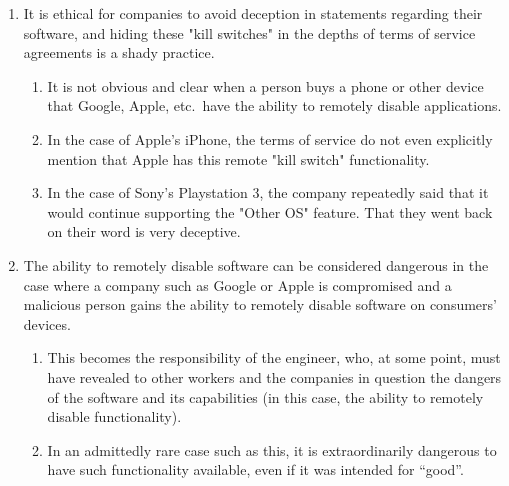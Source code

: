 \documentclass[11pt]{article}
\begin{document}
\begin{enumerate}
\item It is ethical for companies to avoid deception in statements regarding their software, and hiding these "kill switches" in the depths of terms of service agreements is a shady practice. \cite{secode}

   \begin{enumerate}
   \item It is not obvious and clear when a person buys a phone or other device that Google, Apple, etc.\ have the ability to remotely disable applications.
   \item In the case of Apple's iPhone, the terms of service do not even explicitly mention that Apple has this remote "kill switch" functionality. \cite{appleTOS}
   \item In the case of Sony's Playstation 3, the company repeatedly said that it would continue supporting the "Other OS" feature. That they went back on their word is very deceptive. \cite{sonyLawsuit2}
   \end{enumerate}

\item The ability to remotely disable software can be considered dangerous in the case where a company such as Google or Apple is compromised and a malicious person gains the ability to remotely disable software on consumers' devices.

   \begin{enumerate}
   \item This becomes the responsibility of the engineer, who, at some point, must have revealed to other workers and the companies in question the dangers of the software and its capabilities (in this case, the ability to remotely disable functionality). \cite{secode}
   \item In an admittedly rare case such as this, it is extraordinarily dangerous to have such functionality available, even if it was intended for ``good''.
   \end{enumerate}

\end{enumerate}

\nocite{texTemp}
\nocite{BibTex}
\nocite{BibMang}
\nocite{bibStyle}


\end{document}
